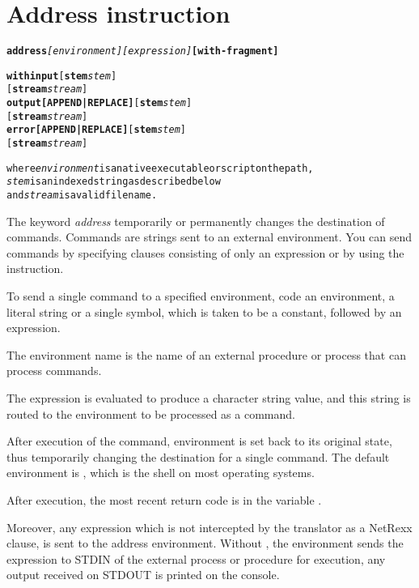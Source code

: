 \chapter{Address instruction}\label{refaddress}
\begin{shaded}
  \begin{alltt}
  \textbf{address} \emph{[environment]} \emph{[expression]} \textbf{[with - fragment]}

  \textbf{with} \textbf{input} [\textbf{stem} \emph{stem}]
             [\textbf{stream} \emph{stream}]
	  \textbf{output} \textbf{[APPEND|REPLACE]} [\textbf{stem} \emph{stem}]
                          [\textbf{stream} \emph{stream}]
	  \textbf{error} \textbf{[APPEND|REPLACE]} [\textbf{stem} \emph{stem}]
                         [\textbf{stream} \emph{stream}]
                
where \emph{environment} is a native executable or script on the path,
\emph{stem} is an indexed string as described below
and \emph{stream} is a valid filename.
\end{alltt}

% 
\end{shaded}
The keyword \emph{address} temporarily or permanently changes the destination of commands. Commands are strings sent to an external environment. You can send commands by specifying clauses consisting of only an expression or by using the  instruction.

To send a single command to a specified environment, code an
environment, a literal string or a single symbol, which is taken to be
a constant, followed by an expression.

The environment name is the
name of an external procedure or process that can process
commands.

The expression is evaluated to produce a character string
value, and this string is routed to the environment to be processed as
a command.

After execution of the command, environment is set back to
its original state, thus temporarily changing the destination for a
single command. The default environment is , which is the shell
on most operating systems.

After execution, the most recent return code is in the variable .

Moreover, any expression which is not intercepted by the translator as a NetRexx clause, is sent to the address environment.
Without , the environment sends the expression to STDIN of the external process or procedure for execution, any output received on STDOUT is printed on the console.

